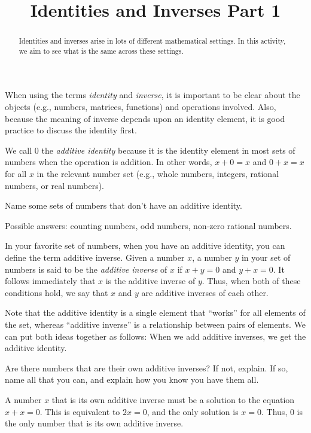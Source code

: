\documentclass{ximera}
\title{Identities and Inverses Part 1}
\begin{document}
\begin{abstract}
Identities and inverses arise in lots of different mathematical settings.  In this activity, we aim to see what is the same across these settings.  
\end{abstract}
\maketitle


%
%
When using the terms \emph{identity} and \emph{inverse}, it is important to be clear about the objects (e.g., numbers, matrices, functions) and operations involved.  Also, because the meaning of inverse depends upon an identity element, it is good practice to discuss the identity first.  

We call $0$ the \emph{additive identity} because it is the identity element in most sets of numbers when the operation is addition.  In other words, $x+0=x$ and $0+x=x$ for all $x$ in the relevant number set (e.g., whole numbers, integers, rational numbers, or real numbers). 
\begin{question}
Name some sets of numbers that don't have an additive identity.  
\begin{freeResponse}
Possible answers:  counting numbers, odd numbers, non-zero rational numbers.  
\end{freeResponse}
\end{question}

In your favorite set of numbers, when you have an additive identity, you can define the term additive inverse.  Given a number $x$, a number $y$ in your set of numbers is said to be the \emph{additive inverse} of $x$ if $x+y=0$ and $y+x=0$.  It follows immediately that $x$ is the additive inverse of $y$.  Thus, when both of these conditions hold, we say that $x$ and $y$ are additive inverses of each other.  

Note that the additive identity is a single element that ``works'' for all elements of the set, whereas ``additive inverse'' is a relationship between pairs of elements.  We can put both ideas together as follows:  When we add additive inverses, we get the additive identity.
\begin{question}
Are there numbers that are their own additive inverses?  If not, explain.  If so, name all that you can, and explain how you know you have them all.  
\begin{freeResponse}
A number $x$ that is its own additive inverse must be a solution to the equation $x+x = 0$.  This is equivalent to $2x=0$, and the only solution is $x=0$.  Thus, 0 is the only number that is its own additive inverse.   
\end{freeResponse}
\end{question}
\end{document}
